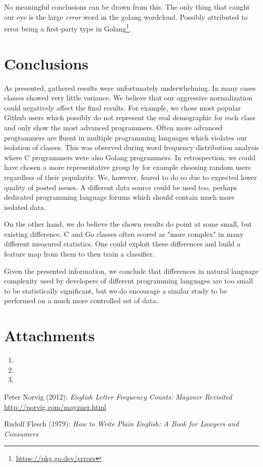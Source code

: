 \documentclass[]{article}
\begin{document}
No meaningful conclusions can be drawn from this. The only thing that caught our eye is the large \emph{error} word in the golang wordcloud. Possibly attributed to error being a first-party type in Golang\footnote{\url{https://pkg.go.dev/errors}}.

\newpage

\section{Conclusions}

As presented, gathered results were unfortunately underwhelming. In many cases classes showed very little variance. We believe that our aggressive normalization could negatively affect the final results. For example, we chose most popular Github users which possibly do not represent the real demographic for each class and only show the most advanced programmers. Often more advanced programmers are fluent in multiple programming languages which violates our isolation of classes. This was observed during word frequency distribution analysis where C programmers were also Golang programmers. In retrospection, we could have chosen a more representative group by for example choosing random users regardless of their popularity. We, however, feared to do so due to expected lower quality of posted issues. A different data source could be used too, perhaps dedicated programming language forums which should contain much more isolated data.

On the other hand, we do believe the shown results do point at some small, but existing difference. C and Go classes often scored as "more complex" in many different measured statistics. One could exploit these differences and build a feature map from them to then train a classifier.

Given the presented information, we conclude that differences in natural language complexity used by developers of different programming languages are too small to be statistically significant, but we do encourage a similar study to be performed on a much more controlled set of data.

\section{Attachments} \label{attachments}

\begin{enumerate}
    \item %
    \item %
    \item %
\end{enumerate}


\begin{thebibliography}{9}
    Peter Norvig (2012): \emph{English Letter Frequency Counts: Mayzner Revisited} \url{http://norvig.com/mayzner.html}

    Rudolf Flesch (1979): \emph{How to Write Plain English: A Book for Lawyers and Consumers}
\end{thebibliography}
\end{document}
